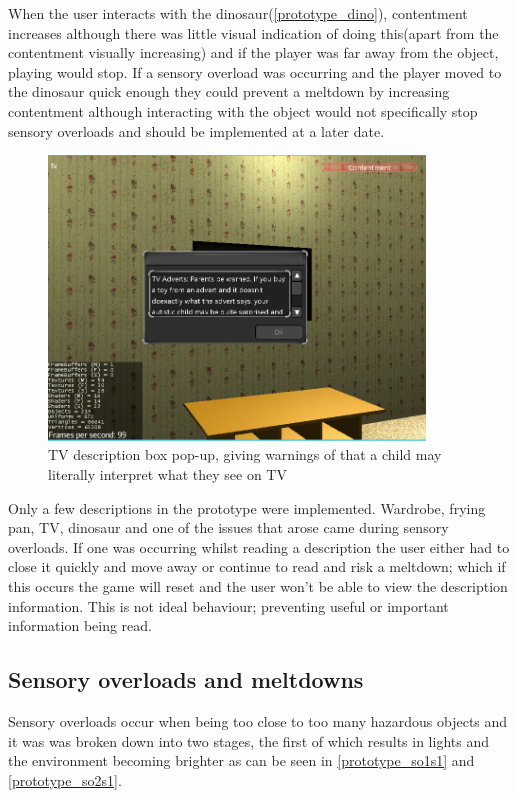 \documentclass[11pt]{report}
\begin{document}
When the user interacts with the dinosaur(\ref{prototype_dino}), contentment increases although there was little visual indication of doing this(apart from the contentment visually increasing) and if the player was far away from the object, playing would stop. If a sensory overload was occurring and the player moved to the dinosaur quick enough they could prevent a meltdown by increasing contentment although interacting with the object would not specifically stop sensory overloads and should be implemented at a later date. 

\begin{figure}[H]
\centering
\includegraphics[width=100mm]{images/prototype/tvdescription.png}
\caption{TV description box pop-up, giving warnings of that a child may literally interpret what they see on TV }
\label{prototype_tvdesc}
\end{figure}

Only a few descriptions in the prototype were implemented. Wardrobe, frying pan, TV, dinosaur and one of the issues that arose came during sensory overloads. If one was occurring whilst reading a description the user either had to close it quickly and move away or continue to read and risk a meltdown; which if this occurs the game will reset and the user won't be able to view the description information. This is not ideal behaviour; preventing useful or important information being read.

\subsection*{Sensory overloads and meltdowns}

Sensory overloads occur when being too close to too many hazardous objects and it was was broken down into two stages, the first of which results in lights and the environment becoming brighter as can be seen in \ref{prototype_so1s1} and \ref{prototype_so2s1}. 
\end{document}
